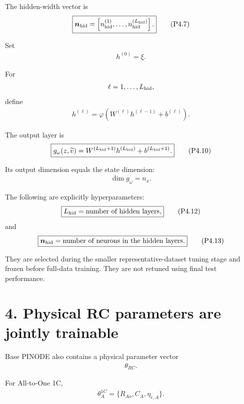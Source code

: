 \documentclass[11pt]{article}
\begin{document}
The hidden-width vector is
\begin{align}
\boxed{
\bm n_{\rm hid}
=
\left[
n_{\rm hid}^{(1)},\ldots,n_{\rm hid}^{(L_{\rm hid})}
\right].
}
\tag{P4.7}
\end{align}

Set
\begin{align}
\boxed{h^{(0)}=\xi.}
\tag{P4.8}
\end{align}

For
\begin{align}
\ell=1,\ldots,L_{\rm hid},
\end{align}
define
\begin{align}
\boxed{
h^{(\ell)}
=
\varphi
\left(
W^{(\ell)}h^{(\ell-1)}+b^{(\ell)}
\right).
}
\tag{P4.9}
\end{align}

The output layer is
\begin{align}
\boxed{
g_\omega(z,\widetilde v)
=
W^{(L_{\rm hid}+1)}h^{(L_{\rm hid})}
+
b^{(L_{\rm hid}+1)}.
}
\tag{P4.10}
\end{align}

Its output dimension equals the state dimension:
\begin{align}
\boxed{\dim g_\omega=n_x.}
\tag{P4.11}
\end{align}

The following are explicitly hyperparameters:
\begin{align}
\boxed{L_{\rm hid}=\text{number of hidden layers},}
\tag{P4.12}
\end{align}
and
\begin{align}
\boxed{\bm n_{\rm hid}=\text{number of neurons in the hidden layers}.}
\tag{P4.13}
\end{align}

They are selected during the smaller representative-dataset tuning stage and frozen before full-data training. They are not retuned using final test performance.

\section*{4. Physical RC parameters are jointly trainable}

Base PINODE also contains a physical parameter vector
\begin{align}
\boxed{\theta_{RC}.}
\end{align}

For All-to-One 1C,
\begin{align}
\boxed{
\theta_A^{1C}
=
\{R_{Ao},C_A,\eta_{r,A}\}.
}
\tag{P4.14}
\end{align}
\end{document}
